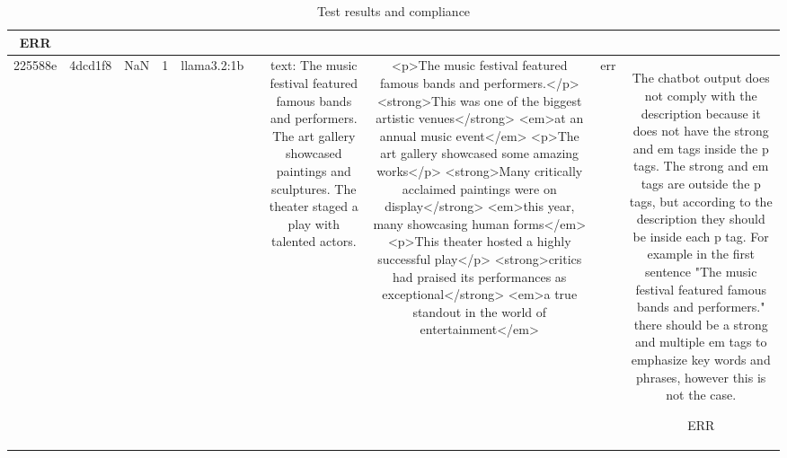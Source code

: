 \begin{table}[h!]
\begin{tabular}{|c|c|c|c|c|c|c|c|c|c|}
ERR\\
\hline
225588e & 4dcd1f8 & NaN & 1 & llama3.2:1b &  & text: The music festival featured famous bands and performers. The art gallery showcased paintings and sculptures. The theater staged a play with talented actors. & <p>The music festival featured famous bands and performers.</p>
<strong>This was one of the biggest artistic venues</strong> <em>at an annual music event</em>
<p>The art gallery showcased some amazing works</p>
<strong>Many critically acclaimed paintings were on display</strong> <em>this year, many showcasing human forms</em>
<p>This theater hosted a highly successful play</p>
<strong>critics had praised its performances as exceptional</strong> <em>a true standout in the world of entertainment</em> & err & The chatbot output does not comply with the description because it does not have the strong and em tags inside the p tags. The strong and em tags are outside the p tags, but according to the description they should be inside each p tag. For example in the first sentence "The music festival featured famous bands and performers." there should be a strong and multiple em tags to emphasize key words and phrases, however this is not the case.

ERR
  \end{tabular}
  \caption{Test results and compliance}
  
  \end{table}
  